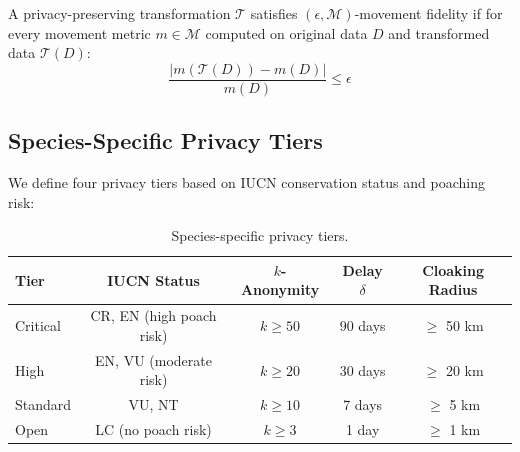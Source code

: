 \begin{definition}
A privacy-preserving transformation $\mathcal{T}$ satisfies $(\epsilon, \mathcal{M})$-movement fidelity if for every movement metric $m \in \mathcal{M}$ computed on original data $D$ and transformed data $\mathcal{T}(D)$:
\begin{equation}
\frac{|m(\mathcal{T}(D)) - m(D)|}{m(D)} \leq \epsilon
\end{equation}
\end{definition}

\subsection{Species-Specific Privacy Tiers}

We define four privacy tiers based on IUCN conservation status and poaching risk:

\begin{table}[htbp]
\centering
\caption{Species-specific privacy tiers.}
\label{tab:tiers}
\begin{tabular}{lcccc}
\toprule
\textbf{Tier} & \textbf{IUCN Status} & $k$\textbf{-Anonymity} & \textbf{Delay} $\delta$ & \textbf{Cloaking Radius} \\
\midrule
Critical & CR, EN (high poach risk) & $k \geq 50$ & 90 days & $\geq$ 50 km \\
High & EN, VU (moderate risk) & $k \geq 20$ & 30 days & $\geq$ 20 km \\
Standard & VU, NT & $k \geq 10$ & 7 days & $\geq$ 5 km \\
Open & LC (no poach risk) & $k \geq 3$ & 1 day & $\geq$ 1 km \\
\bottomrule
\end{tabular}
\end{table}

